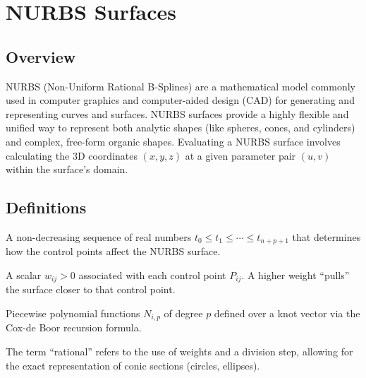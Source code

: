 \section{NURBS Surfaces}
\label{sec:nurbs_surface}

\subsection{Overview}
NURBS (Non-Uniform Rational B-Splines) are a mathematical model commonly used in computer graphics and computer-aided design (CAD) for generating and representing curves and surfaces\cite{piegl1997}. NURBS surfaces provide a highly flexible and unified way to represent both analytic shapes (like spheres, cones, and cylinders) and complex, free-form organic shapes. Evaluating a NURBS surface involves calculating the 3D coordinates $(x, y, z)$ at a given parameter pair $(u, v)$ within the surface's domain.

\subsection{Definitions}
\begin{definition}\label{def:knot_vector}
A non-decreasing sequence of real numbers $t_0 \leq t_1 \leq \cdots \leq t_{n+p+1}$ that determines how the control points affect the NURBS surface.
\end{definition}

\begin{definition}\label{def:nurbs_weights}
A scalar $w_{ij} > 0$ associated with each control point $P_{ij}$. A higher weight ``pulls'' the surface closer to that control point.
\end{definition}

\begin{definition}\label{def:bspline_basis}
Piecewise polynomial functions $N_{i,p}$ of degree $p$ defined over a knot vector via the Cox-de Boor recursion formula.
\end{definition}

\begin{definition}\label{def:rational_surface}
The term ``rational'' refers to the use of weights and a division step, allowing for the exact representation of conic sections (circles, ellipses).
\end{definition}

